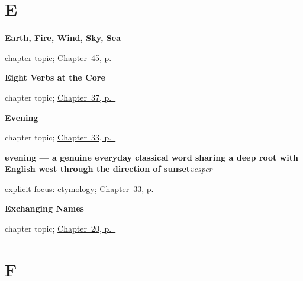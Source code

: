\section*{E}

\noindent\begin{minipage}[t]{\linewidth}
\raggedright
\textbf{Earth, Fire, Wind, Sky, Sea}\par
\footnotesize chapter topic; \hyperref[ch:la-mundus]{Chapter~45, p.~\pageref*{ch:la-mundus}}
\end{minipage}\par\smallskip

\noindent\begin{minipage}[t]{\linewidth}
\raggedright
\textbf{Eight Verbs at the Core}\par
\footnotesize chapter topic; \hyperref[ch:la-core-verbs]{Chapter~37, p.~\pageref*{ch:la-core-verbs}}
\end{minipage}\par\smallskip

\noindent\begin{minipage}[t]{\linewidth}
\raggedright
\textbf{Evening}\par
\footnotesize chapter topic; \hyperref[ch:la-evening]{Chapter~33, p.~\pageref*{ch:la-evening}}
\end{minipage}\par\smallskip

\noindent\begin{minipage}[t]{\linewidth}
\raggedright
\textbf{evening — a genuine everyday classical word sharing a deep root with English west through the direction of sunset}\enspace\emph{vesper}\par
\footnotesize explicit focus: etymology; \hyperref[ch:la-evening]{Chapter~33, p.~\pageref*{ch:la-evening}}
\end{minipage}\par\smallskip

\noindent\begin{minipage}[t]{\linewidth}
\raggedright
\textbf{Exchanging Names}\par
\footnotesize chapter topic; \hyperref[ch:la-exchanging-names]{Chapter~20, p.~\pageref*{ch:la-exchanging-names}}
\end{minipage}\par\smallskip

\section*{F}

